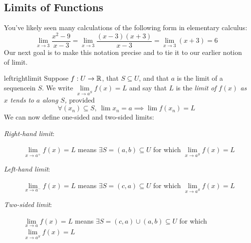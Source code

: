 \setcounter{subsection}{19}
\subsection{Limits of Functions}

You've likely seen many calculations of the following form in elementary calculus:
\[\lim_{x\to 3}\frac{x^2-9}{x-3}=\lim_{x\to 3}\frac{(x-3)(x+3)}{x-3}=\lim_{x\to 3}(x+3)=6\]
Our next goal is to make this notation precise and to tie it to our earlier notion of limit.

\begin{defn}{}{leftrightlimit}
Suppose $f:U\to\mathbb{R}$, that $S\subseteq U$, and that $a$ is the limit of a sequence\footnotemark in $S$.\smallbreak
We write $\lim\limits_{x\to a^S}f(x)=L$ and say that $L$ is the \emph{limit of $f(x)$ as $x$ tends to $a$ along $S$,} provided
\[\forall (x_n)\subseteq S,\ \lim x_n=a\implies \lim f(x_n)=L\]
We can now define one-sided and two-sided limits:
\begin{description}
	\item[\normalfont\emph{Right-hand limit}:] $\lim\limits_{x\to a^+}f(x)=L$ means $\exists S=(a,b)\subseteq U$ for which $\lim\limits_{x\to a^S}f(x)=L$
	\item[\normalfont\emph{Left-hand limit}:] $\lim\limits_{x\to a^-}f(x)=L$ means $\exists S=(c,a)\subseteq U$ for which $\lim\limits_{x\to a^S}f(x)=L$
	\item[\normalfont\emph{Two-sided limit}:] $\lim\limits_{x\to a}f(x)=L$ means $\exists S=(c,a)\cup(a,b)\subseteq U$ for which $\lim\limits_{x\to a^S}f(x)=L$
\end{description}
\end{defn}


